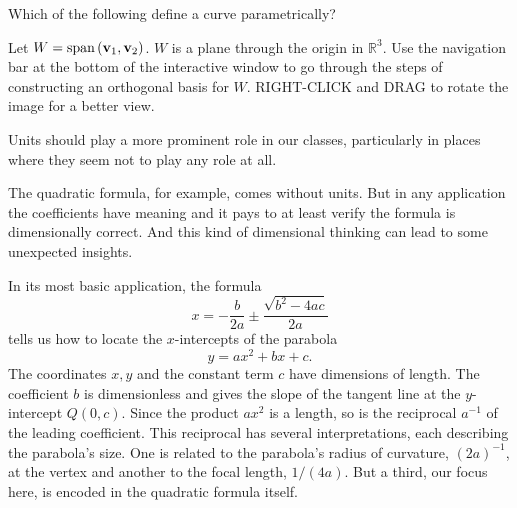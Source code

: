 \documentclass{ximera}
\begin{document}
\begin{exercise}  
  Which of the following define a curve parametrically?  
  \begin{multipleChoice}  
  \end{multipleChoice}  
\end{exercise}  

\begin{exploration}\label{exp:orth2}
Let $W =\mbox{span}\left({\bf v}_1,{\bf v}_2\right)$. $W$ is a plane through the origin in $\mathbb{R}^3$.  Use the navigation bar at the bottom of the interactive window to go through the steps of constructing an orthogonal basis for $W$.  RIGHT-CLICK and DRAG to rotate the image for a better view.
 
 
\begin{onlineOnly}
    \begin{center}
\end{center}
\end{onlineOnly}
\end{exploration}



Units should play a more prominent role in our classes, particularly in places where they seem not to play any role at all.

The quadratic formula, for example, comes without units. But in any application the coefficients have meaning and it pays to at least verify the formula is dimensionally correct. And this kind of dimensional thinking can lead to some unexpected insights. %

In its most basic application, the formula
\[
   x = -\frac{b}{2a}\pm \frac{\sqrt{b^2-4ac}}{2a}
\]
tells us how to locate the $x$-intercepts of the parabola 
\begin{equation}
 y=ax^2+bx+c.   \label{Eq:Parabola}
 \end{equation}
 The coordinates $x,y$ and the constant term $c$ have dimensions of length. The coefficient $b$ is dimensionless and gives the slope of the tangent line at the $y$-intercept $Q(0,c)$. Since the product $ax^2$ is a length, so is the reciprocal $a^{-1}$ of the leading coefficient. This reciprocal has several interpretations, each describing the parabola's size. One is related to the parabola's radius of curvature, $(2a)^{-1}$, at the vertex and another to the focal length, $1/(4a)$. But a third, our focus here, is encoded in the quadratic formula itself.
\end{document}
